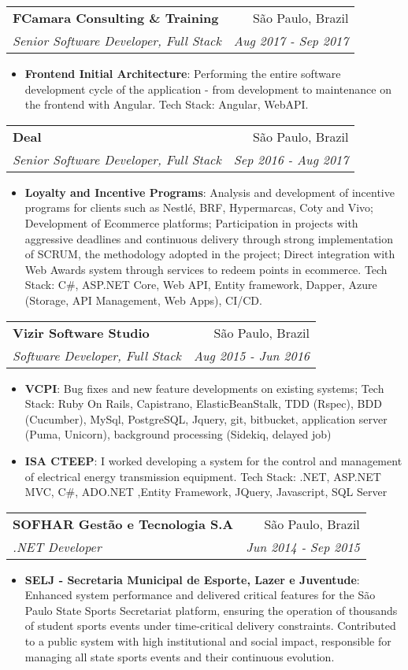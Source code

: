 \documentclass[letterpaper,11pt]{article}
\makeatletter
\newcommand{\resumeItem}[2]{
  \item\small{
    \textbf{#1}{: #2 \vspace{-2pt}}
  }
}
\newcommand{\resumeSubheading}[4]{
  \vspace{-1pt}\item
    \begin{tabular*}{0.97\textwidth}[t]{l@{\extracolsep{\fill}}r}
      \textbf{#1} & #2 \\
      \textit{\small#3} & \textit{\small #4} \\
    \end{tabular*}\vspace{-5pt}
}
\newcommand{\resumeSubSubheading}[2]{
    \begin{tabular*}{0.97\textwidth}{l@{\extracolsep{\fill}}r}
      \textit{\small#1} & \textit{\small #2} \\
    \end{tabular*}\vspace{-5pt}
}
\newcommand{\resumeSubHeadingListEnd}{\end{itemize}}
\newcommand{\resumeItemListStart}{\begin{itemize}}
\newcommand{\resumeItemListEnd}{\end{itemize}\vspace{-5pt}}
\makeatother
\begin{document}
    \resumeSubheading
    {FCamara Consulting \& Training}{São Paulo, Brazil}
    {Senior Software Developer, Full Stack}{Aug 2017 - Sep 2017}
    \resumeItemListStart
      \resumeItem{Frontend Initial Architecture}
        {Performing the entire software development cycle of the application - from development to maintenance on the frontend with Angular. Tech Stack: Angular, WebAPI.}
    \resumeItemListEnd


    \resumeSubheading
    {Deal}{São Paulo, Brazil}
    {Senior Software Developer, Full Stack}{Sep 2016 - Aug 2017}
    \resumeItemListStart
      \resumeItem{Loyalty and Incentive Programs}
        {Analysis and development of incentive programs for clients such as Nestlé, BRF, Hypermarcas, Coty and Vivo;
        Development of Ecommerce platforms;
        Participation in projects with aggressive deadlines and continuous delivery through strong implementation of SCRUM, the methodology adopted in the project;
        Direct integration with Web Awards system through services to redeem points in ecommerce.
        Tech Stack: C\#, ASP.NET Core, Web API, Entity framework, Dapper, Azure (Storage, API Management, Web Apps), CI/CD.}
    \resumeItemListEnd

    \resumeSubheading
      {Vizir Software Studio}{São Paulo, Brazil}
      {Software Developer, Full Stack}{Aug 2015 - Jun 2016}
      \resumeItemListStart
        \resumeItem{VCPI}
          {Bug fixes and new feature developments on existing systems; Tech Stack: Ruby On Rails, Capistrano, ElasticBeanStalk, TDD
          (Rspec), BDD (Cucumber), MySql, PostgreSQL, Jquery, git, bitbucket, application server (Puma, Unicorn), background processing (Sidekiq, delayed job)}
        \resumeItem{ISA CTEEP}
          {I worked developing a system for the control and management of electrical energy transmission equipment. Tech Stack: .NET, ASP.NET MVC, C\#, ADO.NET ,Entity Framework, JQuery, Javascript, SQL Server}
      \resumeItemListEnd
      
    \resumeSubheading
    {SOFHAR Gestão e Tecnologia S.A}{São Paulo, Brazil}
    {.NET Developer}{Jun 2014 - Sep 2015}
    \resumeItemListStart
      \resumeItem{SELJ - Secretaria Municipal de Esporte, Lazer e Juventude}
        {Enhanced system performance and delivered critical features for the São Paulo State Sports Secretariat platform, ensuring the operation of thousands of student sports events under time-critical delivery constraints. Contributed to a public system with high institutional and social impact, responsible for managing all state sports events and their continuous evolution.}
    \resumeItemListEnd
\end{document}
